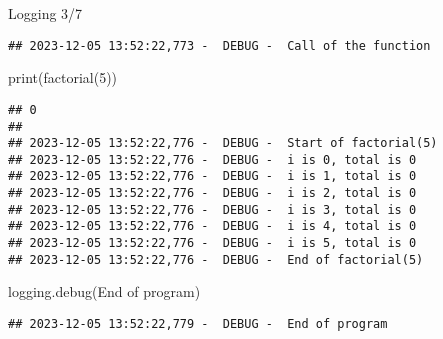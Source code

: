 \documentclass[
  8pt,
  ignorenonframetext,
]{beamer}
\newenvironment{Shaded}{\begin{snugshade}}{\end{snugshade}}
\newcommand{\BuiltInTok}[1]{#1}
\newcommand{\DecValTok}[1]{\textcolor[rgb]{0.00,0.00,0.81}{#1}}
\newcommand{\NormalTok}[1]{#1}
\newcommand{\StringTok}[1]{\textcolor[rgb]{0.31,0.60,0.02}{#1}}
\begin{document}
\begin{frame}[fragile]{Logging 3/7}
\begin{verbatim}
## 2023-12-05 13:52:22,773 -  DEBUG -  Call of the function
\end{verbatim}

\begin{Shaded}
\begin{Highlighting}[]
\BuiltInTok{print}\NormalTok{(factorial(}\DecValTok{5}\NormalTok{))}
\end{Highlighting}
\end{Shaded}

\begin{verbatim}
## 0
## 
## 2023-12-05 13:52:22,776 -  DEBUG -  Start of factorial(5)
## 2023-12-05 13:52:22,776 -  DEBUG -  i is 0, total is 0
## 2023-12-05 13:52:22,776 -  DEBUG -  i is 1, total is 0
## 2023-12-05 13:52:22,776 -  DEBUG -  i is 2, total is 0
## 2023-12-05 13:52:22,776 -  DEBUG -  i is 3, total is 0
## 2023-12-05 13:52:22,776 -  DEBUG -  i is 4, total is 0
## 2023-12-05 13:52:22,776 -  DEBUG -  i is 5, total is 0
## 2023-12-05 13:52:22,776 -  DEBUG -  End of factorial(5)
\end{verbatim}

\begin{Shaded}
\begin{Highlighting}[]
\NormalTok{logging.debug(}\StringTok{\textquotesingle{}End of program\textquotesingle{}}\NormalTok{)}
\end{Highlighting}
\end{Shaded}

\begin{verbatim}
## 2023-12-05 13:52:22,779 -  DEBUG -  End of program
\end{verbatim}
\end{frame}
\end{document}
